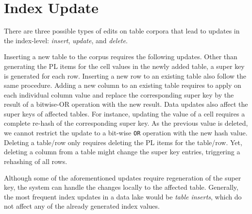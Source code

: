 
\section{Index Update }
There are three possible types of edits on table corpora that lead to updates in the index-level: {\em insert}, {\em update}, and {\em delete}.

Inserting a new table to the corpus requires the following updates.
Other than generating the PL items for the cell values in the newly added table, a super key is generated for each row. 
Inserting a new row to an existing table also follow the same procedure. 
Adding a new column to an existing table requires to apply \hash on each individual column value and replace the corresponding super key by the result of a bitwise-OR operation with the new \hash result.
Data updates also affect the super keys of affected tables.
For instance, updating the value of a cell requires a complete re-hash of the corresponding super key.
As the previous value is deleted, we cannot restrict the update to a bit-wise \texttt{OR} operation with the new hash value.
Deleting a table/row only requires deleting the PL items for the table/row.
Yet, deleting a column from a table might change the super key entries, triggering a rehashing of all rows.

Although some of the aforementioned updates require regeneration of the super key, the system can handle the changes locally to the affected table.
Generally, the most frequent index updates in a data lake would be \textit{table inserts}, which do not affect any of the already generated index values.
